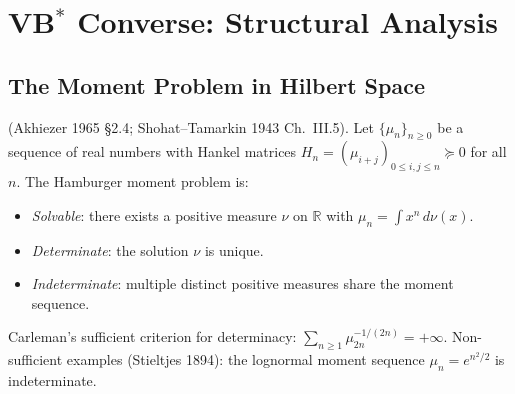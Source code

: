 \section{VB\(^{*}\) Converse: Structural Analysis}
\label{v4-arith:hpvbconv:VBstar-converse}

\subsection{The Moment Problem in Hilbert Space}
\label{v4-arith:hpvbconv:moment-problem}

\begin{theorem}
\label{v4-arith:hpvbconv:thm:determinacy}
(Akhiezer 1965 \S2.4; Shohat--Tamarkin
1943 Ch.~III.5). Let \(\{\mu_{n}\}_{n\geq 0}\) be a sequence of real
numbers with Hankel matrices
\(H_{n}=(\mu_{i+j})_{0\leq i,j\leq n}\succeq 0\) for all \(n\). The
Hamburger moment problem is:
\begin{itemize}
\item \emph{Solvable}: there exists a positive measure \(\nu\) on
\(\mathbb{R}\) with \(\mu_{n}=\int x^{n}\,d\nu(x)\).
\item \emph{Determinate}: the solution \(\nu\) is unique.
\item \emph{Indeterminate}: multiple distinct positive measures share
the moment sequence.
\end{itemize}
Carleman's sufficient criterion for determinacy:
\(\sum_{n\geq 1}\mu_{2n}^{-1/(2n)}=+\infty\).
Non-sufficient examples (Stieltjes 1894): the lognormal moment
sequence \(\mu_{n}=e^{n^{2}/2}\) is indeterminate.
\end{theorem}

